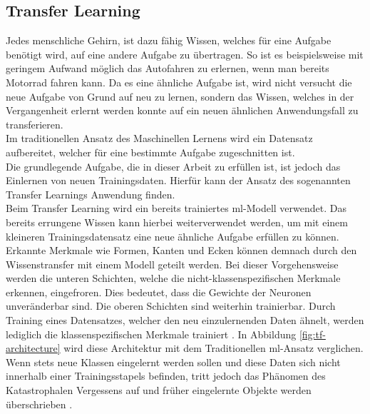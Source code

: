 \documentclass[oneside]{ausarbeitung}
\begin{document}
\subsection{Transfer Learning}
Jedes menschliche Gehirn, ist dazu fähig Wissen, welches für eine Aufgabe benötigt wird, auf eine andere Aufgabe zu übertragen. So ist es beispielsweise mit geringem Aufwand möglich das Autofahren zu erlernen, wenn man bereits Motorrad fahren kann. Da es eine ähnliche Aufgabe ist, wird nicht versucht die neue Aufgabe von Grund auf neu zu lernen, sondern das Wissen, welches in der Vergangenheit erlernt werden konnte auf ein neuen ähnlichen Anwendungsfall zu transferieren.\\
Im traditionellen Ansatz des Maschinellen Lernens wird ein Datensatz aufbereitet, welcher für eine bestimmte Aufgabe zugeschnitten ist.\\
Die grundlegende Aufgabe, die in dieser Arbeit zu erfüllen ist, ist jedoch das Einlernen von neuen Trainingsdaten. Hierfür kann der Ansatz des sogenannten Transfer Learnings Anwendung finden.\\
Beim Transfer Learning wird ein bereits trainiertes \ac{ml}-Modell verwendet. Das bereits errungene Wissen kann hierbei weiterverwendet werden, um mit einem kleineren Trainingsdatensatz eine neue ähnliche Aufgabe erfüllen zu können. Erkannte Merkmale wie Formen, Kanten und Ecken können demnach durch den Wissenstransfer mit einem Modell geteilt werden. Bei dieser Vorgehensweise werden die unteren Schichten, welche die nicht-klassenspezifischen Merkmale erkennen, eingefroren. Dies bedeutet, dass die Gewichte der Neuronen unveränderbar sind. Die oberen Schichten sind weiterhin trainierbar. Durch Training eines Datensatzes, welcher den neu einzulernenden Daten ähnelt, werden lediglich die klassenspezifischen Merkmale trainiert \cite{Senchanka2019}. In Abbildung \ref{fig:tf-architecture} wird diese Architektur mit dem Traditionellen \ac{ml}-Ansatz verglichen.\\
Wenn stets neue Klassen eingelernt werden sollen und diese Daten sich nicht innerhalb einer Trainingsstapels befinden, tritt jedoch das Phänomen des Katastrophalen Vergessens auf und früher eingelernte Objekte werden überschrieben \cite{cl-vs-tl}.
\end{document}
